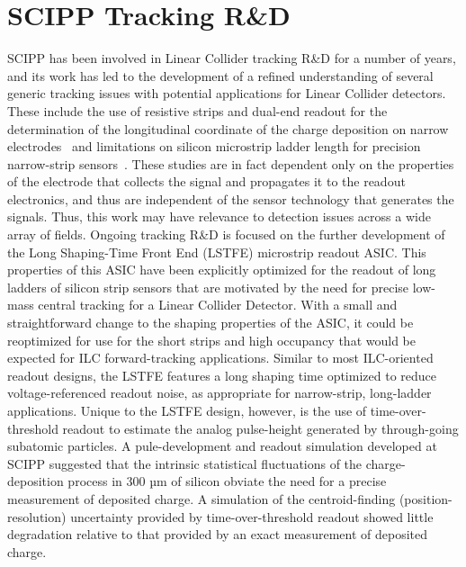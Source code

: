\section{SCIPP Tracking R\&D}
SCIPP has been involved in Linear Collider tracking R\&D for a number of years, and its work has led to the development of a refined understanding of several generic tracking issues with potential applications for Linear Collider detectors. These include the use of resistive strips and dual-end readout for the determination of the longitudinal coordinate of the charge deposition on narrow electrodes~\cite{Carman2011118} and limitations on silicon microstrip ladder length for precision narrow-strip sensors~\cite{Collier2013127}. These studies are in fact dependent only on the properties of the electrode that collects the signal and propagates it to the readout electronics, and thus are independent of the sensor technology that generates the signals. Thus, this work may have relevance to detection issues across a wide array of fields.
Ongoing tracking R\&D is focused on the further development of the Long Shaping-Time Front End (LSTFE) microstrip readout ASIC. This properties of this ASIC have been explicitly optimized for the readout of long ladders of silicon strip sensors that are motivated by the need for precise low-mass central tracking for a Linear Collider Detector. With a small and straightforward change to the shaping properties of the ASIC, it could be reoptimized for use for the short strips and high occupancy that would be expected for ILC forward-tracking applications.
Similar to most ILC-oriented readout designs, the LSTFE features a long shaping time optimized to reduce voltage-referenced readout noise, as appropriate for narrow-strip, long-ladder applications. Unique to the LSTFE design, however, is the use of time-over-threshold readout to estimate the analog pulse-height generated by through-going subatomic particles. A pule-development and readout simulation developed at SCIPP suggested that the intrinsic statistical fluctuations of the charge-deposition process in 300 µm of silicon obviate the need for a precise measurement of deposited charge. A simulation of the centroid-finding (position-resolution) uncertainty provided by time-over-threshold readout showed little degradation relative to that provided by an exact measurement of deposited charge.
